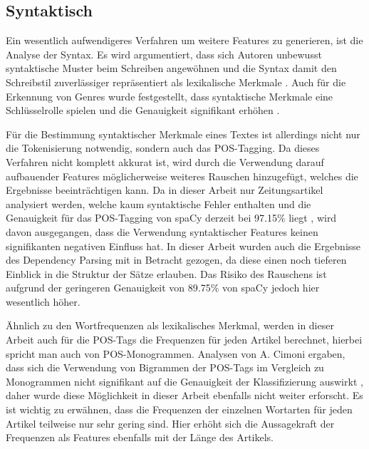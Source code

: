 
\subsection{Syntaktisch}
Ein wesentlich aufwendigeres Verfahren um weitere Features zu generieren, ist die Analyse der Syntax. Es wird argumentiert, dass sich Autoren unbewusst syntaktische Muster beim Schreiben angewöhnen und die Syntax damit den Schreibstil zuverlässiger repräsentiert als lexikalische Merkmale \cite[S.~542]{stamatatos2009survey}. Auch für die Erkennung von Genres wurde festgestellt, dass syntaktische Merkmale eine Schlüsselrolle spielen und die Genauigkeit signifikant erhöhen \cite{cimino2017identifying}.

Für die Bestimmung syntaktischer Merkmale eines Textes ist allerdings nicht nur die Tokenisierung notwendig, sondern auch das POS-Tagging. Da dieses Verfahren nicht komplett akkurat ist, wird durch die Verwendung darauf aufbauender Features möglicherweise weiteres Rauschen hinzugefügt, welches die Ergebnisse beeinträchtigen kann. Da in dieser Arbeit nur Zeitungsartikel analysiert werden, welche kaum syntaktische Fehler enthalten und die Genauigkeit für das POS-Tagging von spaCy derzeit bei 97.15\% liegt \cite{spacyAccuracy}, wird davon ausgegangen, dass die Verwendung syntaktischer Features keinen signifikanten negativen Einfluss hat. In dieser Arbeit wurden auch die Ergebnisse des Dependency Parsing mit in Betracht gezogen, da diese einen noch tieferen Einblick in die Struktur der Sätze erlauben. Das Risiko des Rauschens ist aufgrund der geringeren Genauigkeit von 89.75\% von spaCy \cite{spacyAccuracy} jedoch hier wesentlich höher.

Ähnlich zu den Wortfrequenzen als lexikalisches Merkmal, werden in dieser Arbeit auch für die POS-Tags die Frequenzen für jeden Artikel berechnet, hierbei spricht man auch von POS-Monogrammen. Analysen von A. Cimoni ergaben, dass sich die Verwendung von Bigrammen der POS-Tags im Vergleich zu Monogrammen nicht signifikant auf die Genauigkeit der Klassifizierung auswirkt \cite{cimino2017identifying}, daher wurde diese Möglichkeit in dieser Arbeit ebenfalls nicht weiter erforscht. Es ist wichtig zu erwähnen, dass die Frequenzen der einzelnen Wortarten für jeden Artikel teilweise nur sehr gering sind. Hier erhöht sich die Aussagekraft der Frequenzen als Features ebenfalls mit der Länge des Artikels.

